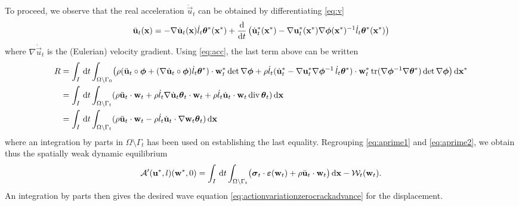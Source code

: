 To proceed, we observe that the real acceleration $\ddot{\vec{u}}_t$ can be obtained by differentiating \eqref{eq:v}
\begin{equation} \label{eq:acc}
\ddot{\vec{u}}_t(\vec{x})=-\nabla\dot{\vec{u}}_t(\vec{x})\dot{l}_t\vtheta^*(\vec{x}^*)+\frac{\md}{\md t}\left(\dot{\vec{u}}_t^*(\vec{x}^*)-\nabla\vec{u}_t^*(\vec{x}^*)\nabla\philt(\vec{x}^*)^{-1}\dot{l}_t\vtheta^*(\vec{x}^*)\right)
\end{equation}
where $\nabla\dot{\vec{u}}_t$ is the (Eulerian) velocity gradient. Using \eqref{eq:acc}, the last term above can be written
\begin{equation} \label{eq:aprime2}
\begin{aligned}
R &= \int_I\D{t}\int_\domaini\bigl(\rho(\ddot{\vec{u}}_t\circ\philt+(\nabla\dot{\vec{u}}_t\circ\philt)\dot{l}_t\vtheta^*)\cdot\vec{w}_t^*\det\nabla\philt+\rho\dot{l}_t(\dot{\vec{u}}_t^*-\nabla\vec{u}_t^*\nabla\philt^{-1}\,\dot{l}_t\vtheta^*)\cdot\vec{w}_t^*\tr(\nabla\philt^{-1}\nabla\vtheta^*)\det\nabla\philt\bigr)\dxx \\
&= \int_I\D{t}\int_\domaint(\rho\ddot{\vec{u}}_t\cdot\vec{w}_t+\rho\dot{l}_t\nabla\dot{\vec{u}}_t\vtheta_t\cdot\vec{w}_t+\rho\dot{l}_t\dot{\vec{u}}_t\cdot\vec{w}_t\div\vtheta_t)\dx \\
&= \int_I\D{t}\int_\domaint(\rho\ddot{\vec{u}}_t\cdot\vec{w}_t-\rho\dot{l}_t\dot{\vec{u}}_t\cdot\nabla\vec{w}_t\vtheta_t)\dx
\end{aligned}
\end{equation}
where an integration by parts in $\Omega\setminus\Gamma_t$ has been used on establishing the last equality. Regrouping \eqref{eq:aprime1} and \eqref{eq:aprime2}, we obtain thus the spatially weak dynamic equilibrium
\begin{equation} \label{eq:spatiallyweakdyneq}
\mathcal{A}'(\vec{u}^*,l)(\vec{w}^*,0)=\int_I\D{t}\int_\domaint\bigl(\sig_t\cdot\eps(\vec{w}_t)+\rho\ddot{\vec{u}}_t\cdot\vec{w}_t\bigr)\dx-\mathcal{W}_t(\vec{w}_t).
\end{equation}
An integration by parts then gives the desired wave equation \eqref{eq:actionvariationzerocrackadvance} for the displacement.

